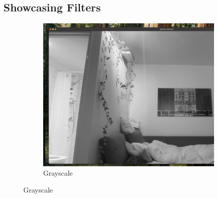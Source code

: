 \documentclass[12pt,a4paper]{article}
\begin{document}
\subsection{Showcasing Filters}
\begin{figure}[H]
    \centering
    \begin{subfigure}[b]{0.20\textwidth}
        \centering
        \includegraphics[width=\textwidth]{filters/grey.png}
        \caption{Grayscale}
        \label{fig:filter_grayscale}
    \end{subfigure}
    
    \vspace{0.1cm}
    

\end{figure}
\end{document}
